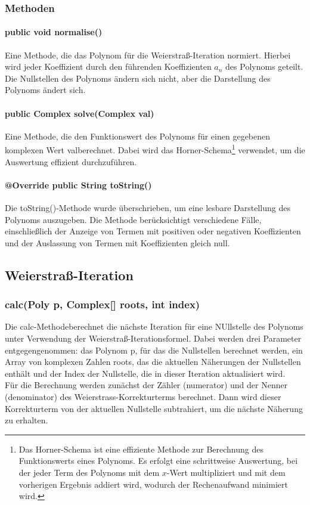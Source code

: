 \documentclass[12pt]{article}
\begin{document}
\subsubsection{Methoden}
\paragraph{public void normalise()} 
Eine Methode, die das Polynom für die Weierstraß-Iteration normiert. Hierbei wird jeder Koeffizient durch den führenden Koeffizienten $a_n$ des Polynoms geteilt. Die Nullstellen des Polynoms ändern sich nicht, aber die Darstellung des Polynoms ändert sich.

\paragraph{public Complex solve(Complex val)}
Eine Methode, die den Funktionswert des Polynoms für einen gegebenen komplexen Wert \glqq val\grqq\space berechnet. Dabei wird das Horner-Schema\footnote{
    Das Horner-Schema ist eine effiziente Methode zur Berechnung des Funktionswerts eines Polynoms. Es erfolgt eine schrittweise Auswertung, bei der jeder Term des Polynoms mit dem $x$-Wert multipliziert und mit dem vorherigen Ergebnis addiert wird, wodurch der Rechenaufwand minimiert wird.
} verwendet, um die Auswertung effizient durchzuführen. 

\paragraph{@Override public String toString()}
Die \glqq toString()\grqq -Methode wurde überschrieben, um eine lesbare Darstellung des Polynoms auszugeben. Die Methode berücksichtigt verschiedene Fälle, einschließlich der Anzeige von Termen mit positiven oder negativen Koeffizienten und der Auslassung von Termen mit Koeffizienten gleich null.

\subsection{Weierstraß-Iteration}

\subsubsection{calc(Poly p, Complex[] roots, int index)}
Die \glqq calc-Methode\grqq\space berechnet die nächste Iteration für eine NUllstelle des Polynoms unter Verwendung der Weierstraß-Iterationsformel. Dabei werden drei Parameter entgegengenommen: das Polynom \glqq p\grqq, für das die Nullstellen berechnet werden, ein Array von komplexen Zahlen \glqq roots\grqq, das die aktuellen Näherungen der Nullstellen enthält und der Index der Nullstelle, die in dieser Iteration aktualisiert wird.\\
Für die Berechnung werden zunächst der Zähler (\glqq numerator\grqq) und der Nenner (\glqq denominator\grqq) des Weierstrass-Korrekturterms berechnet. Dann wird dieser Korrekturterm von der aktuellen Nullstelle subtrahiert, um die nächste Näherung zu erhalten.
\end{document}
